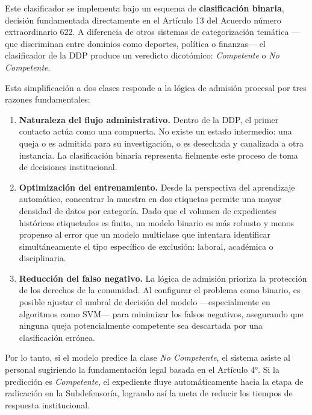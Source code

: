 Este clasificador se implementa bajo un esquema de \textbf{clasificación binaria},
decisión fundamentada directamente en el Artículo 13 del Acuerdo número
extraordinario 622. A diferencia de otros sistemas de categorización temática
—que discriminan entre dominios como deportes, política o finanzas— el
clasificador de la DDP produce un veredicto dicotómico: \textit{Competente} o
\textit{No Competente}.

Esta simplificación a dos clases responde a la lógica de admisión procesal por
tres razones fundamentales:

\begin{enumerate}
  \item \textbf{Naturaleza del flujo administrativo.} Dentro de la DDP, el primer
        contacto actúa como una compuerta. No existe un estado intermedio: una
        queja o es admitida para su investigación, o es desechada y canalizada a
        otra instancia. La clasificación binaria representa fielmente este proceso
        de toma de decisiones institucional.

  \item \textbf{Optimización del entrenamiento.} Desde la perspectiva del
        aprendizaje automático, concentrar la muestra en dos etiquetas permite
        una mayor densidad de datos por categoría. Dado que el volumen de
        expedientes históricos etiquetados es finito, un modelo binario es más
        robusto y menos propenso al error que un modelo multiclase que intentara
        identificar simultáneamente el tipo específico de exclusión: laboral,
        académica o disciplinaria.

  \item \textbf{Reducción del falso negativo.} La lógica de admisión prioriza
        la protección de los derechos de la comunidad. Al configurar el problema
        como binario, es posible ajustar el umbral de decisión del modelo
        —especialmente en algoritmos como SVM— para minimizar los falsos
        negativos, asegurando que ninguna queja potencialmente competente sea
        descartada por una clasificación errónea.
\end{enumerate}

Por lo tanto, si el modelo predice la clase \textit{No Competente}, el sistema
asiste al personal sugiriendo la fundamentación legal basada en el Artículo 4°.
Si la predicción es \textit{Competente}, el expediente fluye automáticamente hacia
la etapa de radicación en la Subdefensoría, logrando así la meta de reducir los
tiempos de respuesta institucional.

